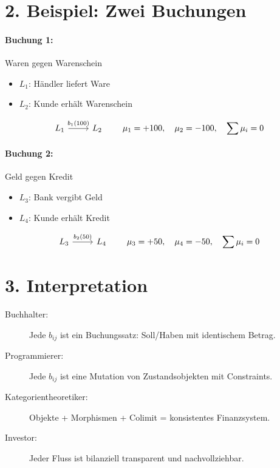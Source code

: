\documentclass{article}
\begin{document}
\section*{2. Beispiel: Zwei Buchungen}

\paragraph{Buchung 1:} Waren gegen Warenschein

\begin{itemize}
  \item \( L_1 \): Händler liefert Ware
  \item \( L_2 \): Kunde erhält Warenschein
\end{itemize}

\[
\begin{tikzcd}
L_1 \arrow[r, "b_1(100)"] & L_2
\end{tikzcd}
\qquad
\mu_1 = +100, \quad \mu_2 = -100, \quad \sum \mu_i = 0
\]

\paragraph{Buchung 2:} Geld gegen Kredit

\begin{itemize}
  \item \( L_3 \): Bank vergibt Geld
  \item \( L_4 \): Kunde erhält Kredit
\end{itemize}

\[
\begin{tikzcd}
L_3 \arrow[r, "b_2(50)"] & L_4
\end{tikzcd}
\qquad
\mu_3 = +50, \quad \mu_4 = -50, \quad \sum \mu_i = 0
\]

\section*{3. Interpretation}

\begin{description}
  \item[Buchhalter:] Jede \( b_{ij} \) ist ein Buchungssatz: Soll/Haben mit identischem Betrag.
  \item[Programmierer:] Jede \( b_{ij} \) ist eine Mutation von Zustandsobjekten mit Constraints.
  \item[Kategorientheoretiker:] Objekte + Morphismen + Colimit = konsistentes Finanzsystem.
  \item[Investor:] Jeder Fluss ist bilanziell transparent und nachvollziehbar.
\end{description}
\end{document}
